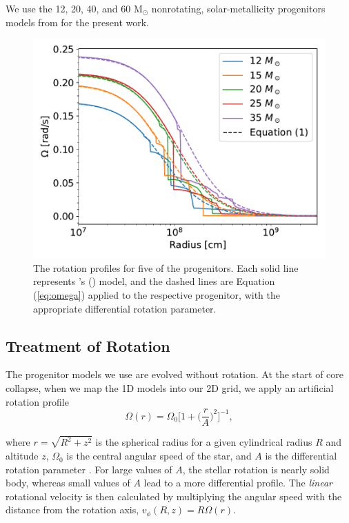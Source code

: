 \documentclass[twocolumn,times]{aastex62}  %
\newcommand{\Msun}{\ensuremath{\mathrm{M}_\odot}\xspace}
\begin{document}
We use the 12, 20, 40, and 60 \Msun nonrotating, solar-metallicity progenitors models from \citet{Suk:2016} for the present work.

\begin{figure}[t]
    \centering
    \includegraphics[scale=0.45]{omega_vs_r.pdf}
    \caption{The rotation profiles for five of the \citet{heger:2005} progenitors.  Each solid line represents \citeauthor{heger:2005}'s (\citeyear{heger:2005}) model, and the dashed lines are Equation (\ref{eq:omega}) applied to the respective progenitor, with the appropriate differential rotation parameter.  }
    \label{fig:ovsr}
\end{figure}

\subsection{Treatment of Rotation}




The progenitor models we use are evolved without rotation.
At the start of core collapse, when we map the 1D models into our 2D grid, we apply an artificial rotation profile
\begin{equation}
    \Omega(r) = \Omega_0 \bigg[1 + \bigg(\frac{r}{A}\bigg)^2 \bigg]^{-1}, 
    \label{eq:omega}
\end{equation}

where $r = \sqrt{R^2 + z^2}$ is the spherical radius for a given cylindrical radius $R$ and altitude $z$, $\Omega_0$ is the central angular speed of the star, and $A$ is the differential rotation parameter \citep{eriguchi:1984}.  For large values of $A$, the stellar rotation is nearly solid body, whereas small values of $A$ lead to a more differential profile. 
The {\it linear} rotational velocity is then calculated by multiplying the angular speed with the distance from the rotation axis, $v_\phi (R, z) = R \Omega (r) $. 
\end{document}
